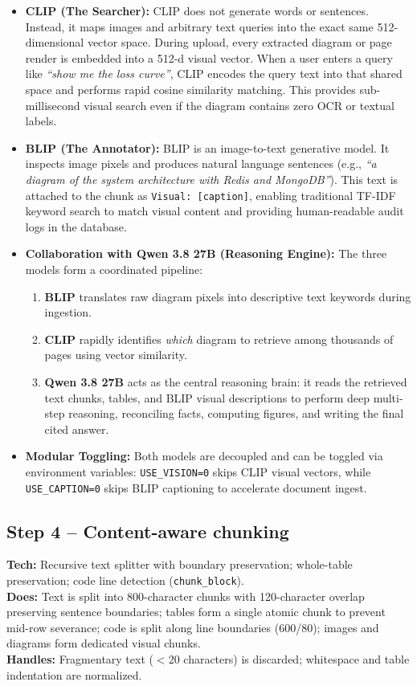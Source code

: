 \documentclass[11pt,a4paper]{article}
\begin{document}
\begin{itemize}[leftmargin=1.0cm]
\item \textbf{CLIP (The Searcher):} CLIP does not generate words or sentences. Instead, it maps images and arbitrary text queries into the exact same 512-dimensional vector space. During upload, every extracted diagram or page render is embedded into a 512-d visual vector. When a user enters a query like \emph{``show me the loss curve''}, CLIP encodes the query text into that shared space and performs rapid cosine similarity matching. This provides sub-millisecond visual search even if the diagram contains zero OCR or textual labels.
\item \textbf{BLIP (The Annotator):} BLIP is an image-to-text generative model. It inspects image pixels and produces natural language sentences (e.g., \emph{``a diagram of the system architecture with Redis and MongoDB''}). This text is attached to the chunk as \texttt{Visual: [caption]}, enabling traditional TF-IDF keyword search to match visual content and providing human-readable audit logs in the database.
\item \textbf{Collaboration with Qwen 3.8 27B (Reasoning Engine):} The three models form a coordinated pipeline:
\begin{enumerate}[leftmargin=0.8cm]
\item \textbf{BLIP} translates raw diagram pixels into descriptive text keywords during ingestion.
\item \textbf{CLIP} rapidly identifies \emph{which} diagram to retrieve among thousands of pages using vector similarity.
\item \textbf{Qwen 3.8 27B} acts as the central reasoning brain: it reads the retrieved text chunks, tables, and BLIP visual descriptions to perform deep multi-step reasoning, reconciling facts, computing figures, and writing the final cited answer.
\end{enumerate}
\item \textbf{Modular Toggling:} Both models are decoupled and can be toggled via environment variables: \texttt{USE\_VISION=0} skips CLIP visual vectors, while \texttt{USE\_CAPTION=0} skips BLIP captioning to accelerate document ingest.
\end{itemize}


\subsection{Step 4 -- Content-aware chunking}
\textbf{Tech:} Recursive text splitter with boundary preservation; whole-table preservation; code line detection (\texttt{chunk\_block}).\\
\textbf{Does:} Text is split into 800-character chunks with 120-character overlap preserving sentence boundaries; tables form a single atomic chunk to prevent mid-row severance; code is split along line boundaries (600/80); images and diagrams form dedicated visual chunks.\\
\textbf{Handles:} Fragmentary text ($<$20 characters) is discarded; whitespace and table indentation are normalized.
\end{document}
